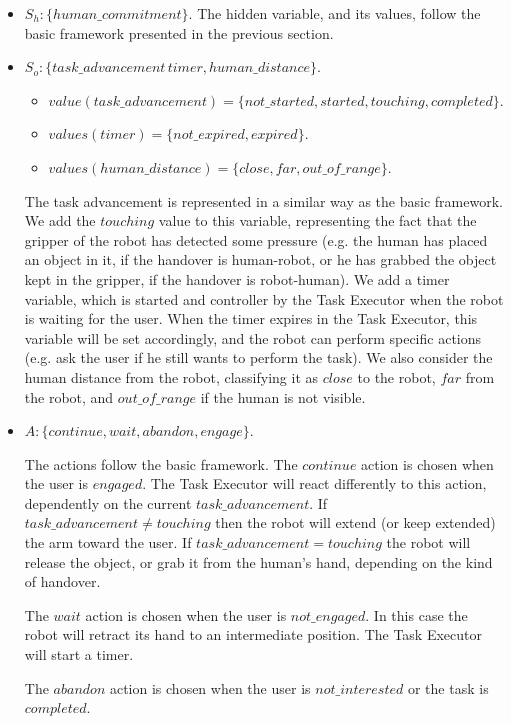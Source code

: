 \begin{itemize}
	\item $S_h:\{human\_commitment\}$.
		The hidden variable, and its values, follow the basic framework presented in the previous section.
	\item $S_o:\{task\_advancement\, timer, human\_distance\}$.
		\begin{itemize}
			\item $value(task\_advancement)=\{not\_started,started,touching,completed\}$.
			\item $values(timer)=\{not\_expired,expired\}$.
			\item $values(human\_distance)=\{close, far, out\_of\_range\}$.
		\end{itemize}

		The task advancement is represented in a similar way as the basic framework. We add the $touching$ value to this variable, representing the fact that the gripper of the robot has detected some pressure (e.g. the human has placed an object in it, if the handover is human-robot, or he has grabbed the object kept in the gripper, if the handover is robot-human).
		 We add a timer variable, which is started and controller by the Task Executor when the robot is waiting for the user. When the timer expires in the Task Executor, this variable will be set accordingly, and the robot can perform specific actions (e.g. ask the user if he still wants to perform the task).
		 We also consider the human distance from the robot, classifying it as $close$ to the robot, $far$ from the robot, and $out\_of\_range$ if the human is not visible. 
	\item $A:\{continue,wait,abandon,engage\}$.

		The actions follow the basic framework. The $continue$ action is chosen when the user is $engaged$. The Task Executor will react differently to this action, dependently on the current $task\_advancement$. If $task\_advancement \neq touching$ then the robot will extend (or keep extended) the arm toward the user. If $task\_advancement=touching$ the robot will release the object, or grab it from the human's hand, depending on the kind of handover.

		The $wait$ action is chosen when the user is $not\_engaged$. In this case the robot will retract its hand to an intermediate position. The Task Executor will start a timer.

		The $abandon$ action is chosen when the user is $not\_interested$ or the task is $completed$.


\end{itemize}
